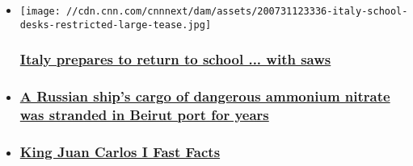 \begin{itemize}
\item
  \href{/2020/08/07/europe/italy-school-return-sawing-up-desks-coronavirus-intl/index.html}{}

  \texttt{[image: //cdn.cnn.com/cnnnext/dam/assets/200731123336-italy-school-desks-restricted-large-tease.jpg]}

  \hypertarget{italy-prepares-to-return-to-school--with-saws}{%
  \subsubsection{\texorpdfstring{\href{/2020/08/07/europe/italy-school-return-sawing-up-desks-coronavirus-intl/index.html}{Italy
  prepares to return to school ... with
  saws}}{Italy prepares to return to school ... with saws}}\label{italy-prepares-to-return-to-school--with-saws}}
\item
  \hypertarget{a-russian-ships-cargo-of-dangerous-ammonium-nitrate-was-stranded-in-beirut-port-for-years}{%
  \subsubsection{\texorpdfstring{\href{/2020/08/05/europe/lebanon-russian-ship-blast-intl/index.html}{A
  Russian ship's cargo of dangerous ammonium nitrate was stranded in
  Beirut port for
  years}}{A Russian ship's cargo of dangerous ammonium nitrate was stranded in Beirut port for years}}\label{a-russian-ships-cargo-of-dangerous-ammonium-nitrate-was-stranded-in-beirut-port-for-years}}
\item
  \hypertarget{king-juan-carlos-i-fast-facts}{%
  \subsubsection{\texorpdfstring{\href{/2012/12/14/world/europe/king-juan-carlos-i---fast-facts/index.html}{King
  Juan Carlos I Fast
  Facts}}{King Juan Carlos I Fast Facts}}\label{king-juan-carlos-i-fast-facts}}
\end{itemize}


